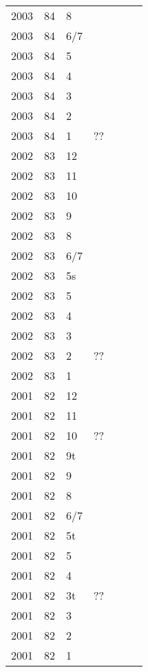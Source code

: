 \begin{longtable}{ |l|l|l|l|p{2.7cm}|l|p{2cm}| }
 2003 & 84 &     8 &         &  &  & \\
 2003 & 84 &   6/7 &         &  &  & \\
 2003 & 84 &     5 &         &  &  & \\
 2003 & 84 &     4 &         &  &  & \\
 2003 & 84 &     3 &         &  &  & \\
 2003 & 84 &     2 &         &  &  & \\
 2003 & 84 &     1 &     ??  &  &  & \\
 2002 & 83 &    12 &         &  &  & \\
 2002 & 83 &    11 &         &  &  & \\
 2002 & 83 &    10 &         &  &  & \\
 2002 & 83 &     9 &         &  &  & \\
 2002 & 83 &     8 &         &  &  & \\
 2002 & 83 &   6/7 &         &  &  & \\
 2002 & 83 &    5s &         &  &  & \\
 2002 & 83 &     5 &         &  &  & \\
 2002 & 83 &     4 &         &  &  & \\
 2002 & 83 &     3 &         &  &  & \\
 2002 & 83 &     2 &    ??   &  &  & \\
 2002 & 83 &     1 &         &  &  & \\
 2001 & 82 &    12 &         &  &  & \\
 2001 & 82 &    11 &         &  &  & \\
 2001 & 82 &    10 &      ?? &  &  & \\
 2001 & 82 &    9t &         &  &  & \\
 2001 & 82 &     9 &         &  &  & \\
 2001 & 82 &     8 &         &  &  & \\
 2001 & 82 &   6/7 &         &  &  & \\
 2001 & 82 &    5t &         &  &  & \\
 2001 & 82 &     5 &         &  &  & \\
 2001 & 82 &     4 &         &  &  & \\
 2001 & 82 &    3t &     ??  &  &  & \\
 2001 & 82 &     3 &         &  &  & \\
 2001 & 82 &     2 &         &  &  & \\
 2001 & 82 &     1 &         &  &  & \\

\end{longtable}
